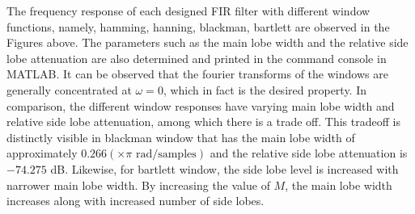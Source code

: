 \documentclass{lab_sheet}
\begin{document}
The frequency response of each designed FIR filter with different window functions, namely, hamming, hanning, blackman, bartlett are observed in the Figures above. The parameters such as the main lobe width and the relative side lobe attenuation are also determined and printed in the command console in MATLAB. It can be observed that the fourier transforms of the windows are generally concentrated at $\omega=0$, which in fact is the desired property. In comparison, the different window responses have varying main lobe width and relative side lobe attenuation, among which there is a trade off. This tradeoff is distinctly visible in blackman window that has the main lobe width of approximately $0.266 (\times \pi \text{ rad/samples})$  and the relative side lobe attenuation is $-74.275$ dB. Likewise, for bartlett window, the side lobe level is increased with narrower main lobe width. By increasing the value of $M$, the main lobe width increases along with increased number of side lobes.
\end{document}
